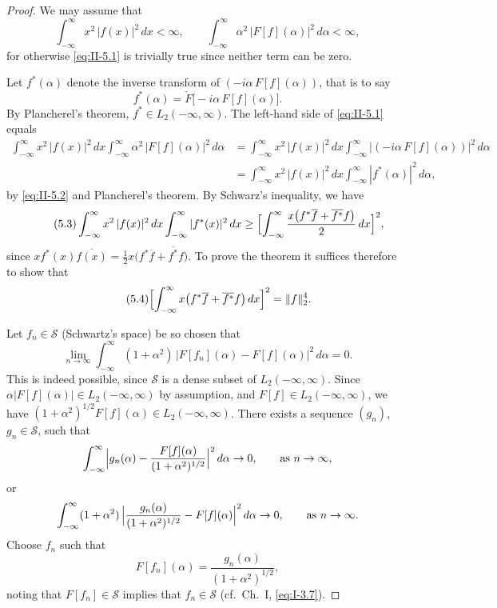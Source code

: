 \begin{proof}
We may assume that
\[
\int_{-\infty}^{\infty}x^{2}\,|f(x)|^{2}\,dx<\infty,\qquad
\int_{-\infty}^{\infty}\alpha^{2}\,|F[f](\alpha)|^{2}\,d\alpha<\infty,
\]
for otherwise \eqref{eq:II-5.1} is trivially true since neither term can be zero.

Let $f^{*}(\alpha)$ denote the inverse transform of $(-i\alpha\,F[f](\alpha))$, that is to say
\begin{equation}\tag{5.2}\label{eq:II-5.2}
f^{*}(\alpha)=\check F\bigl[-i\alpha\,F[f](\alpha)\bigr].
\end{equation}
By Plancherel's theorem, $f^{*}\in L_{2}(-\infty,\infty)$. The left-hand side of \eqref{eq:II-5.1} equals
\[
\begin{aligned}
\int_{-\infty}^{\infty}x^{2}\,|f(x)|^{2}\,dx
\int_{-\infty}^{\infty}\alpha^{2}\,|F[f](\alpha)|^{2}\,d\alpha &= \int_{-\infty}^{\infty}x^{2}\,|f(x)|^{2}\,dx
\int_{-\infty}^{\infty}\bigl|(-i\alpha\,F[f](\alpha))\bigr|^{2}\,d\alpha\\
&= \int_{-\infty}^{\infty}x^{2}\,|f(x)|^{2}\,dx
\int_{-\infty}^{\infty}|f^{*}(\alpha)|^{2}\,d\alpha,
\end{aligned}
\]
by \eqref{eq:II-5.2} and Plancherel's theorem. By Schwarz's inequality, we have
\begin{equation}\tag{5.3}\label{eq:II-5.3}
\int_{-\infty}^{\infty}x^{2}\,|f(x)|^{2}\,dx
\int_{-\infty}^{\infty}|f^{*}(x)|^{2}\,dx
\ge \Bigl[\int_{-\infty}^{\infty}\frac{x\bigl(f^{*}\overline{f}+\overline{f^{*}}f\bigr)}{2}\,dx\Bigr]^{2},
\end{equation}
since $x f^{*}(x)\overline{f(x)}=\frac{1}{2}x\bigl(f^{*}\overline{f}+\overline{f^{*}}f\bigr)$. To prove the theorem it suffices therefore to show that
\begin{equation}\tag{5.4}\label{eq:II-5.4}
\Bigl[\int_{-\infty}^{\infty}x\bigl(f^{*}\overline{f}+\overline{f^{*}}f\bigr)\,dx\Bigr]^{2}=\|f\|_{2}^{4}.
\end{equation}

Let $f_{n}\in\mathcal S$ (Schwartz's space) be so chosen that
\begin{equation}\tag{5.5}\label{eq:II-5.5}
\lim_{n\to\infty}\int_{-\infty}^{\infty}(1+\alpha^{2})\,
\bigl|F[f_{n}](\alpha)-F[f](\alpha)\bigr|^{2}\,d\alpha=0.
\end{equation}
This is indeed possible, since $\mathcal S$ is a dense subset of $L_{2}(-\infty,\infty)$. Since $\alpha|F[f](\alpha)|\in L_{2}(-\infty,\infty)$ by assumption, and $F[f]\in L_{2}(-\infty,\infty)$, we have $(1+\alpha^{2})^{1/2}F[f](\alpha)\in L_{2}(-\infty,\infty)$. There exists a sequence $(g_{n})$, $g_{n}\in\mathcal S$, such that
\[
\int_{-\infty}^{\infty}\Bigl|g_{n}(\alpha)-\frac{F[f](\alpha)}{(1+\alpha^{2})^{1/2}}\Bigr|^{2}\,d\alpha\to 0,\qquad\text{as }n\to\infty,
\]
or
\[
\int_{-\infty}^{\infty}(1+\alpha^{2})\,
\Bigl|\frac{g_{n}(\alpha)}{(1+\alpha^{2})^{1/2}}-F[f](\alpha)\Bigr|^{2}\,d\alpha\to 0,\qquad\text{as }n\to\infty.
\]
Choose $f_{n}$ such that
\[
F[f_{n}](\alpha)=\frac{g_{n}(\alpha)}{(1+\alpha^{2})^{1/2}},
\]
noting that $F[f_{n}]\in\mathcal S$ implies that $f_{n}\in\mathcal S$ (cf.\ Ch.~I, \eqref{eq:I-3.7}).


\end{proof}
